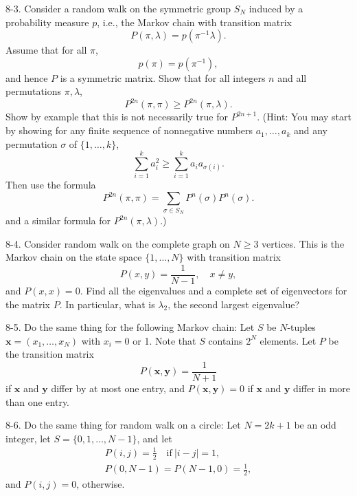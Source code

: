 \documentclass{stml-l}
\theoremstyle{definition}
\numberwithin{equation}{chapter}
\numberwithin{figure}{chapter}
\numberwithin{figure}{section}
\begin{document}
8-3. Consider a random walk on the symmetric group $S_{N}$ induced
by a probability measure $p$, i.e., the Markov chain with transition
matrix
\begin{equation*}
P(\pi,\lambda)=p(\pi^{-1}\lambda).
\end{equation*}
Assume that for all $\pi$,
\begin{equation*}
p(\pi)=p(\pi^{-1}),
\end{equation*}
and hence $P$ is a symmetric matrix. Show that for all integers $n$
and all permutations $\pi,\lambda$,
\begin{equation*}
P^{2n}(\pi,\pi)\geq P^{2n}(\pi,\lambda).
\end{equation*}
Show by example that this is not necessarily true for $P^{2n+1}$.
(Hint: You may start by showing for any finite sequence of
nonnegative numbers $a_{1},\ldots,a_{k}$ and any permutation
$\sigma$ of $\{1,\ldots,k\}$,
\begin{equation*}
\sum\limits_{i=1}^{k}a_{i}^{2}\geq\sum\limits_{i=1}^{k}a_{i}a_{\sigma(i)}.
\end{equation*}
Then use the formula
\begin{equation*}
P^{2n}(\pi,\pi)=\sum\limits_{\sigma\in
S_{N}}P^{n}(\sigma)P^{n}(\sigma).
\end{equation*}
and a similar formula for $P^{2n}(\pi,\lambda)$.)

8-4. Consider random walk on the complete graph on $N\geq 3$
vertices. This is the Markov chain on the state space
$\{1,\ldots,N\}$ with transition matrix
\begin{equation*}
P(x,y)=\frac{1}{N-1},\quad x\neq y,
\end{equation*}
and $P(x,x)=0$. Find all the eigenvalues and a complete set of
eigenvectors for the matrix $P$. In particular, what is
$\lambda_{2}$, the second largest eigenvalue?

8-5. Do the same thing for the following Markov chain: Let $S$ be
$N$-tuples $\mathbf{x}= (x_{1},\ldots,x_{N})$ with $x_{i}=0$ or 1.
Note that $S$ contains $2^{N}$ elements. Let $P$ be the transition
matrix
\begin{equation*}
P(\mathbf{x},\mathbf{y})=\frac{1}{N+1}
\end{equation*}
if $\mathbf{x}$ and $\mathbf{y}$ differ by at most one entry, and
$P(\mathbf{x},\mathbf{y})=0$ if $\mathbf{x}$ and $\mathbf{y}$ differ
in more than one entry.

8-6. Do the same thing for random walk on a circle: Let $N= 2k+1$ be
an odd integer, let $S=\{0,1,\ldots,N-1\}$, and let
\begin{gather*}
P(i,j)=\tfrac{1}{2}\quad \mathrm{if}\ |i-j|=1,\\
P(0,N-1)=P(N-1,0)=\tfrac{1}{2},
\end{gather*}
and $P(i,j)=0$, otherwise.
\end{document}
